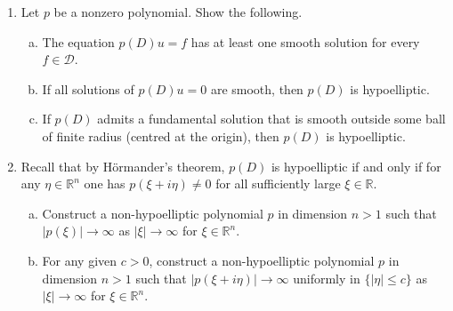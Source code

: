 \documentclass[11pt]{amsart}
\newcommand{\R}{\mathbb{R}}
\newcommand{\tstD}{\mathscr{D}}
\newcommand{\tstE}{\mathscr{E}}
\begin{document}
\begin{enumerate}[1.]
\begin{enumerate}[a)]
\item
If $p(D)$ is a nontrivial differential operator and $u\in\tstE'$ satisfies $p(D)u=0$ then $u=0$.
\end{enumerate}
\item
Let $p$ be a nonzero polynomial. Show the following.
\begin{enumerate}[a)]
\item
The equation $p(D)u=f$ has at least one smooth solution for every $f\in\tstD$.
\item
If all solutions of $p(D)u=0$ are smooth, then $p(D)$ is hypoelliptic.
\item
If $p(D)$ admits a fundamental solution that is smooth outside some ball of finite radius (centred at the origin), 
then $p(D)$ is hypoelliptic.
\end{enumerate}
\item
Recall that by H\"ormander's theorem, $p(D)$ is hypoelliptic if and only if 
for any $\eta\in\R^n$ one has $p(\xi+i\eta)\neq0$ for all sufficiently large $\xi\in\R$.
\begin{enumerate}[a)]
\item
Construct a non-hypoelliptic polynomial $p$ in dimension $n>1$ such that
$|p(\xi)|\to\infty$ as $|\xi|\to\infty$ for $\xi\in\R^n$.
\item
For any given $c>0$, construct a non-hypoelliptic polynomial $p$ in dimension $n>1$ such that
$|p(\xi+i\eta)|\to\infty$ uniformly in $\{|\eta|\leq c\}$ as $|\xi|\to\infty$ for $\xi\in\R^n$.
\end{enumerate}
\end{enumerate}
\end{document}
